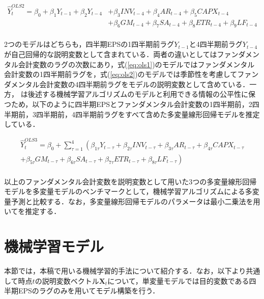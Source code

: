 \documentclass[a4paper，11pt]{jsarticle}
\begin{document}
\begin{equation}
  \begin{split}
    \label{eq:ols2}
    \hat{Y}_t^{OLS2} = \beta_0 + \beta_1Y_{t-1} + \beta_2Y_{t-4} 
    &+ \beta_3INV_{t-4} + \beta_4AR_{t-4} + \beta_5CAPX_{t-4} \\
    &+ \beta_6GM_{t-4} + \beta_7SA_{t-4} + \beta_8ETR_{t-4} + \beta_9LF_{t-4} \\
  \end{split}
\end{equation}

\noindent
2つのモデルはどちらも，四半期EPSの1四半期前ラグ$Y_{t-1}$と4四半期前ラグ$Y_{t-4}$が自己回帰的な説明変数として含まれている．両者の違いとしてはファンダメンタル会計変数のラグの次数にあり，式(\ref{eq:ols1})のモデルではファンダメンタル会計変数の1四半期前ラグを，式(\ref{eq:ols2})のモデルでは季節性を考慮してファンダメンタル会計変数の4四半期前ラグをモデルの説明変数として含めている．一方，\cite*{cao2009neural} は後述する機械学習アルゴリズムのモデルと利用できる情報の公平性に保つため，以下のように四半期EPSとファンダメンタル会計変数の1四半期前，2四半期前，3四半期前，4四半期前ラグをすべて含めた多変量線形回帰モデルを推定している．

\begin{equation}
  \begin{split}
    \label{eq:ols3}
    \hat{Y}_t^{OLS3} = \beta_0 + \sum^{4}_{\tau=1} \left( \beta_{1\tau}Y_{t-\tau} 
    + \beta_{2\tau}INV_{t-\tau} + \beta_{3\tau}AR_{t-\tau} + \beta_{4\tau}CAPX_{t-\tau} \right.\\
    \left.+ \beta_{5\tau}GM_{t-\tau} + \beta_{6\tau}SA_{t-\tau} + \beta_{7\tau}ETR_{t-\tau} + \beta_{8\tau}LF_{t-\tau} \right) \\
  \end{split}
\end{equation}

以上のファンダメンタル会計変数を説明変数として用いた3つの多変量線形回帰モデルを多変量モデルのベンチマークとして，機械学習アルゴリズムによる多変量予測と比較する．なお，多変量線形回帰モデルのパラメータは最小二乗法を用いてを推定する．

\section{機械学習モデル}

本節では，本稿で用いる機械学習的手法について紹介する．なお，以下より共通して時点$t$の説明変数ベクトル$\bm{X}_t$について，単変量モデルでは目的変数である四半期EPSのラグのみを用いてモデル構築を行う．
\end{document}
